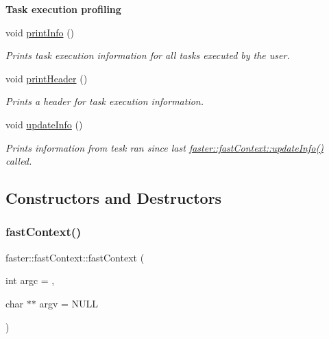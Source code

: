 \begin{Indent}{\bf Task execution profiling}\par
\begin{DoxyCompactItemize}
\item 
\hypertarget{classfaster_1_1fastContext_a0258ce4c9efa6df4cdf46613132c9fd0}{}\label{classfaster_1_1fastContext_a0258ce4c9efa6df4cdf46613132c9fd0} 
void \hyperlink{classfaster_1_1fastContext_a0258ce4c9efa6df4cdf46613132c9fd0}{print\+Info} ()
\begin{DoxyCompactList}\small\item\em Prints task execution information for all tasks executed by the user. \end{DoxyCompactList}\item 
void \hyperlink{classfaster_1_1fastContext_a721a0db53e603bff27578e040b616f6f}{print\+Header} ()
\begin{DoxyCompactList}\small\item\em Prints a header for task execution information. \end{DoxyCompactList}\item 
void \hyperlink{classfaster_1_1fastContext_ae6e69c86414bc5333da72aef13257d26}{update\+Info} ()
\begin{DoxyCompactList}\small\item\em Prints information from tesk ran since last \hyperlink{classfaster_1_1fastContext_ae6e69c86414bc5333da72aef13257d26}{faster\+::fast\+Context\+::update\+Info()} called. \end{DoxyCompactList}\end{DoxyCompactItemize}
\end{Indent}


\subsection{Constructors and Destructors}
\hypertarget{classfaster_1_1fastContext_adf84c9fd9f1d768f1fb8ba8bdd13bb47}{}\label{classfaster_1_1fastContext_adf84c9fd9f1d768f1fb8ba8bdd13bb47} 
\subsubsection{\texorpdfstring{fast\+Context()}{fastContext()}}
{\footnotesize\ttfamily faster\+::fast\+Context\+::fast\+Context (\begin{DoxyParamCaption}\item[{int}]{argc = {},  }\item[{char $\ast$$\ast$}]{argv = {\ttfamily NULL} }\end{DoxyParamCaption})}



